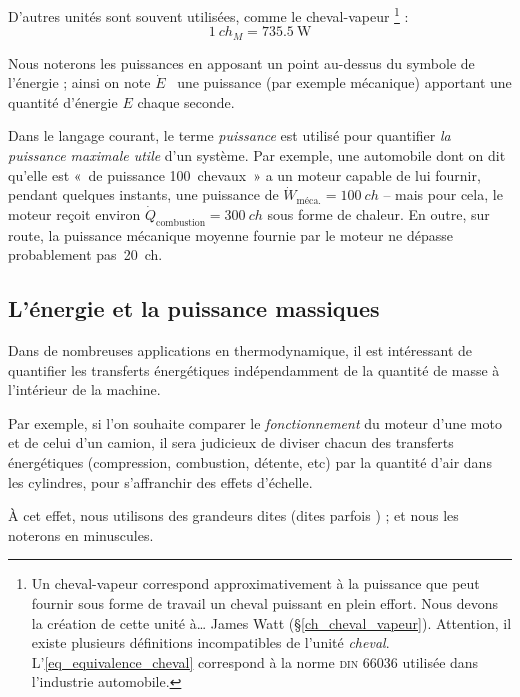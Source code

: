 		D’autres unités sont souvent utilisées, comme le cheval-vapeur%
			\footnote{Un cheval-vapeur correspond approximativement à la puissance que peut fournir sous forme de travail un cheval puissant en plein effort. Nous devons la création de cette unité à… James Watt (\S\ref{ch_cheval_vapeur}). Attention, il existe plusieurs définitions incompatibles de l’unité \textit{cheval}. L’\cref{eq_equivalence_cheval} correspond à la norme \textsc{din} 66036 utilisée dans l’industrie automobile.} : 
		\begin{equation}
			\SI{1}{ch_M} = \SI{735,5}{\watt}
			\label{eq_equivalence_cheval}
		\end{equation}

		Nous noterons les puissances en apposant un point au-dessus du symbole de l’énergie ; ainsi on note $\dot{E}$ \ une puissance (par exemple mécanique) apportant une quantité d’énergie $E$ chaque seconde.

		Dans le langage courant, le terme \textit{puissance} est utilisé pour quantifier \textit{la puissance maximale utile} d’un système. Par exemple, une automobile dont on dit qu’elle est «~de puissance 100~chevaux~» a un moteur capable de lui fournir, pendant quelques instants, une puissance de $\dot W_{\text{méca.}} = \SI{100}{ch}$ -- mais pour cela, le moteur reçoit environ $\dot Q_{\text{combustion}} = \SI{300}{ch}$ sous forme de chaleur. En outre, sur route, la puissance mécanique moyenne fournie par le moteur ne dépasse probablement pas~\SI{20}{ch}.

	\subsection{L’énergie et la puissance massiques}
	\label{ch_valeurs_spécifiques}

		Dans de nombreuses applications en thermodynamique, il est intéressant de quantifier les transferts énergétiques indépendamment de la quantité de masse à l’intérieur de la machine. 

		Par exemple, si l’on souhaite comparer le \emph{fonctionnement} du moteur d’une moto et de celui d’un camion, il sera judicieux de diviser chacun des transferts énergétiques (compression, combustion, détente, etc) par la quantité d’air dans les cylindres, pour s’affranchir des effets d’échelle.

		À cet effet, nous utilisons des grandeurs dites  (dites parfois ) ; et nous les noterons en minuscules.

